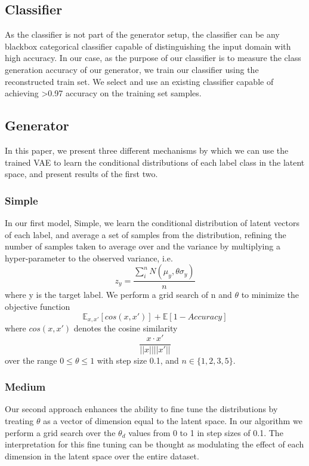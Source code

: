 \documentclass{article}
\begin{document}
\subsection{Classifier}

As the classifier is not part of the generator setup, the classifier can be any blackbox categorical classifier capable of distinguishing the input domain with high accuracy. In our case, as the purpose of our classifier is to measure the class generation accuracy of our generator, we train our classifier using the reconstructed train set. We select and use an existing classifier capable of achieving >0.97 accuracy on the training set samples.

\subsection{Generator}
In this paper, we present three different mechanisms by which we can use the trained VAE to learn the conditional distributions of each label class in the latent space, and present results of the first two.
\subsubsection{Simple}
In our first model, Simple, we learn the conditional distribution of latent vectors of each label, and average a set of samples from the distribution, refining the number of samples taken to average over and the variance by multiplying a hyper-parameter to the observed variance, i.e.
\begin{equation} 
z_y = \frac{\sum_i^n{N(\mu_y, \theta \sigma_y)}}{n}
\end{equation}
where y is the target label. We perform a grid search of n and $\theta$ to minimize the objective function
\begin{equation} 
\mathbb{E}_{x,x'}[cos(x,x')]+ \mathbb{E}[1 - Accuracy] 
\end{equation}
where $cos(x,x')$ denotes the cosine similarity
\begin{equation}
\frac{x\cdot x'}{||x||||x'||}
\end{equation}
over the range $0 \le \theta \le 1$ with step size 0.1, and $n \in \{1,2,3,5\}$.

\subsubsection{Medium}
Our second approach enhances the ability to fine tune the distributions by treating $\theta$ as a vector of dimension equal to the latent space. In our algorithm we perform a grid search over the $\theta_d$ values from 0 to 1 in step sizes of 0.1. The interpretation for this fine tuning can be thought as modulating the effect of each dimension in the latent space over the entire dataset.
\end{document}
